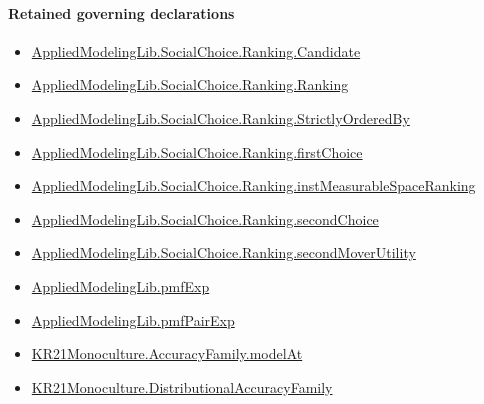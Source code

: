 \documentclass[10pt]{article}
\begin{document}
\paragraph{Retained governing declarations}
\begin{itemize}\raggedright
\item \hyperlink{library-prerequisite-8c0e6c25845ae78a}{Applied\allowbreak{}Modeling\allowbreak{}Lib.\allowbreak{}Social\allowbreak{}Choice.\allowbreak{}Ranking.\allowbreak{}Candidate}
\item \hyperlink{library-prerequisite-5cde54446d1ae021}{Applied\allowbreak{}Modeling\allowbreak{}Lib.\allowbreak{}Social\allowbreak{}Choice.\allowbreak{}Ranking.\allowbreak{}Ranking}
\item \hyperlink{library-prerequisite-3585717d1635654a}{Applied\allowbreak{}Modeling\allowbreak{}Lib.\allowbreak{}Social\allowbreak{}Choice.\allowbreak{}Ranking.\allowbreak{}Strictly\allowbreak{}Ordered\allowbreak{}By}
\item \hyperlink{governing-declaration-08e457479ee6cf15}{Applied\allowbreak{}Modeling\allowbreak{}Lib.\allowbreak{}Social\allowbreak{}Choice.\allowbreak{}Ranking.\allowbreak{}first\allowbreak{}Choice}
\item \hyperlink{governing-declaration-30ca9c740ef703ec}{Applied\allowbreak{}Modeling\allowbreak{}Lib.\allowbreak{}Social\allowbreak{}Choice.\allowbreak{}Ranking.\allowbreak{}inst\allowbreak{}Measurable\allowbreak{}Space\allowbreak{}Ranking}
\item \hyperlink{governing-declaration-25ac37baf58f31e2}{Applied\allowbreak{}Modeling\allowbreak{}Lib.\allowbreak{}Social\allowbreak{}Choice.\allowbreak{}Ranking.\allowbreak{}second\allowbreak{}Choice}
\item \hyperlink{library-prerequisite-21bd2a45ab961ae4}{Applied\allowbreak{}Modeling\allowbreak{}Lib.\allowbreak{}Social\allowbreak{}Choice.\allowbreak{}Ranking.\allowbreak{}second\allowbreak{}Mover\allowbreak{}Utility}
\item \hyperlink{governing-declaration-8e4b4389a4f6454b}{Applied\allowbreak{}Modeling\allowbreak{}Lib.\allowbreak{}pmf\allowbreak{}Exp}
\item \hyperlink{governing-declaration-09677001d465ec9d}{Applied\allowbreak{}Modeling\allowbreak{}Lib.\allowbreak{}pmf\allowbreak{}Pair\allowbreak{}Exp}
\item \hyperlink{governing-declaration-869d6f3944f2bc91}{KR21\allowbreak{}Monoculture.\allowbreak{}Accuracy\allowbreak{}Family.\allowbreak{}model\allowbreak{}At}
\item \hyperlink{paper-prerequisite-ee564fa2921e1add}{KR21\allowbreak{}Monoculture.\allowbreak{}Distributional\allowbreak{}Accuracy\allowbreak{}Family}

\end{itemize}
\end{document}
